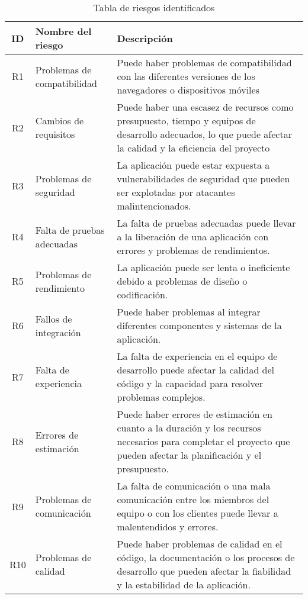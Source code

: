 \begin{table}[H]
	\centering
	\begin{tabular}{|c|m{4cm}|m{10cm}|}
		\hline
		{\textbf{ID}} & {\textbf{Nombre del riesgo}} & {\textbf{Descripción}}                                                                                                                                               \\
		\hline
		R1            & Problemas de compatibilidad  & Puede haber problemas de compatibilidad con las diferentes versiones de los navegadores o dispositivos móviles                                                       \\
		\hline
		R2            & Cambios de requisitos        & Puede haber una escasez de recursos como presupuesto, tiempo y equipos de desarrollo adecuados, lo que puede afectar la calidad y la eficiencia del proyecto         \\
		\hline
		R3            & Problemas de seguridad       & La aplicación puede estar expuesta a vulnerabilidades de seguridad que pueden ser explotadas por atacantes malintencionados.                                         \\
		\hline
		R4            & Falta de pruebas adecuadas   & La falta de pruebas adecuadas puede llevar a la liberación de una aplicación con errores y problemas de rendimientos.                                                \\
		\hline
		R5            & Problemas de rendimiento     & La aplicación puede ser lenta o ineficiente debido a problemas de diseño o codificación.                                                                             \\
		\hline
		R6            & Fallos de integración        & Puede haber problemas al integrar diferentes componentes y sistemas de la aplicación.                                                                                \\
		\hline
		R7            & Falta de experiencia         & La falta de experiencia en el equipo de desarrollo puede afectar la calidad del código y la capacidad para resolver problemas complejos.                             \\
		\hline
		R8            & Errores de estimación        & Puede haber errores de estimación en cuanto a la duración y los recursos necesarios para completar el proyecto que pueden afectar la planificación y el presupuesto. \\
		\hline
		R9            & Problemas de comunicación    & La falta de comunicación o una mala comunicación entre los miembros del equipo o con los clientes puede llevar a malentendidos y errores.                            \\
		\hline
		R10           & Problemas de calidad         & Puede haber problemas de calidad en el código, la documentación o los procesos de desarrollo que pueden afectar la fiabilidad y la estabilidad de la aplicación.     \\
		\hline
	\end{tabular}
	\caption{Tabla de riesgos identificados}
\end{table}